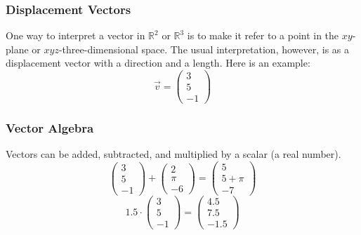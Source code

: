 \documentclass[xcolor=dvipsnames]{beamer}
\begin{document}
\begin{frame}
  \frametitle{Displacement Vectors}
  One way to interpret a vector in $\mathbb{R}^{2}$ or
  $\mathbb{R}^{3}$ is to make it refer to a point in the
  $xy$-plane or $xyz$-three-dimensional space. The usual
  interpretation, however, is as a \alert{displacement vector} with a
  direction and a length. Here is an example:
  \begin{equation}
    \label{eq:lapheeka}
    \vec{v}=\left(
    \begin{array}{c}
      3 \\
      5 \\
      -1
    \end{array}\right)
  \end{equation}
\end{frame}

\begin{frame}
  \frametitle{Vector Algebra}
  Vectors can be added, subtracted, and multiplied by a scalar (a real
  number).
  \begin{equation}
    \label{eq:kaepuema}
    \left(
    \begin{array}{c}
      3 \\
      5 \\
      -1
    \end{array}\right)+
  \left(
    \begin{array}{c}
      2 \\
      \pi \\
      -6
    \end{array}\right)=
  \left(
    \begin{array}{c}
      5 \\
      5+\pi \\
      -7
    \end{array}\right)
  \end{equation}
  \begin{equation}
    \label{eq:kemodaim}
    1.5\cdot\left(
    \begin{array}{c}
      3 \\
      5 \\
      -1
    \end{array}\right)=
  \left(
    \begin{array}{c}
      4.5 \\
      7.5 \\
      -1.5
    \end{array}\right)
  \end{equation}
\end{frame}
\end{document}
